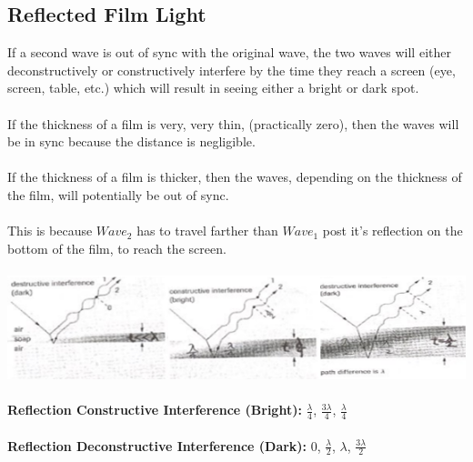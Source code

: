 \documentclass{article}
\begin{document}
\subsection{Reflected Film Light}
If a second wave is out of sync with the original wave, the two waves will either deconstructively or constructively interfere by the time they reach a screen (eye, screen, table, etc.) which will result in seeing either a bright or dark spot.\\\\
If the thickness of a film is very, very thin, (practically zero), then the waves will be in sync because the distance is negligible. \\\\
If the thickness of a film is thicker, then the waves, depending on the thickness of the film, will potentially be out of sync. \\\\
This is because $Wave_2$ has to travel farther than $Wave_1$ post it's reflection on the bottom of the film, to reach the screen.\\\\
\includegraphics[scale=0.5]{images/reflected_films} \\\\
\noindent \textbf{Reflection Constructive Interference (Bright):} $\frac{\lambda}{4}$, $\frac{3\lambda}{4}$, $\frac{\lambda}{4}$ \\\\
\textbf{Reflection Deconstructive Interference (Dark):} $0$, $\frac{\lambda}{2}$, $\lambda$, $\frac{3\lambda}{2}$
\end{document}
